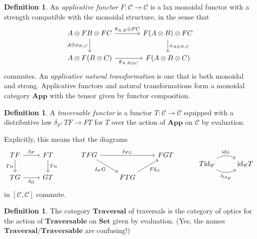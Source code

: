 \documentclass[11pt,letterpaper]{article}
\theoremstyle{plain}
\theoremstyle{definition}
\newtheorem{definition}[theorem]{Definition}
\newcommand{\C}{\mathscr{C}}
\newcommand{\Set}{\mathbf{Set}}
\newcommand{\App}{\mathbf{App}}
\newcommand{\Traversable}{\mathbf{Traversable}}
\newcommand{\Traversal}{\mathbf{Traversal}}
\newcommand{\id}{\mathrm{id}}
\newcommand{\todo}[1]{\textcolor{red}{\small #1}}
\begin{document}
\begin{definition}
An \emph{applicative functor} $F : \C \to \C$ is a lax monoidal functor with a strength compatible with the monoidal structure, in the sense that
\[
\begin{tikzcd}[column sep = large]
A \otimes FB \otimes FC \ar[r, "{\theta_{A, B} \otimes FC}"] \ar[d, swap, "{A \otimes \phi_{B, C}}"] & F(A \otimes B) \otimes FC \ar[d, "{\phi_{A \otimes B, C}}"] \\
A \otimes F(B \otimes C) \ar[r, swap, "{\theta_{A, B \otimes C}}"] & F(A \otimes B \otimes C)
\end{tikzcd}
\]
commutes. An \emph{applicative natural transformation} is one that is both monoidal and strong. Applicative functors and natural transformations form a monoidal category $\App$ with the tensor given by functor composition.
\end{definition}

\begin{definition}
A \emph{traversable functor} is a functor $T : \C \to \C$ equipped with a distributive law $\delta_F : TF \to FT$ for $T$ over the action of $\App$ on $\C$ by evaluation.

Explicitly, this means that the diagrams
\[
  \begin{tikzcd}
    TF \ar[r, "\delta_F"] \ar[d, swap, "T\alpha"] & FT \ar[d, "T\alpha"] \\
    TG \ar[r, swap, "\delta_G"] & GT
  \end{tikzcd} \hspace{1cm}
  \begin{tikzcd}
    TFG \ar[dr, swap, "\delta_F G"] \ar[rr, "\delta_{FG}"] &  & FGT \\
    & FTG \ar[ur, swap, "F \delta_G"] &
  \end{tikzcd} \hspace{1cm}
  \begin{tikzcd}
    T\id_\C \ar[r, bend left, "\id_T"] \ar[r, bend right, swap, "\delta_{\id_\C}"] & \id_\C T
  \end{tikzcd}
\]
in $[\C, \C]$ commute.
\end{definition}

\begin{definition}
The category $\Traversal$ of traversals is the category of optics for the action of $\Traversable$ on $\Set$ given by evaluation. (Yes, the names $\Traversal$/$\Traversable$ are confusing!)
\end{definition}

\end{document}
